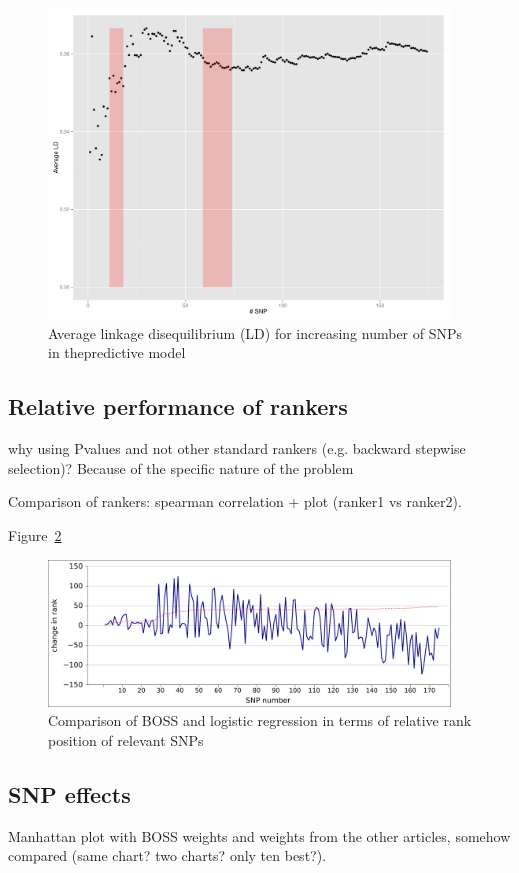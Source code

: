 \begin{figure}
\includegraphics[width=0.95\textwidth]{LD.pdf}
\caption{Average linkage disequilibrium (LD) for increasing number of
  SNPs in thepredictive model}
\label{fig:ld} 
\end{figure}

\subsection{Relative performance of rankers}
why using Pvalues and not other standard rankers (e.g. backward stepwise
selection)? Because of the specific nature of the problem

Comparison of rankers: spearman correlation + plot (ranker1 vs ranker2).

Figure~\ref{fig:rank}

\begin{figure}
\includegraphics[width=0.95\textwidth]{rank.pdf}
\caption{Comparison of BOSS and logistic regression in terms of relative
rank position of relevant SNPs}
\label{fig:rank} 
\end{figure}


\subsection{SNP effects}
Manhattan plot with BOSS weights and weights from the other articles,
somehow compared (same chart? two charts? only ten best?).

